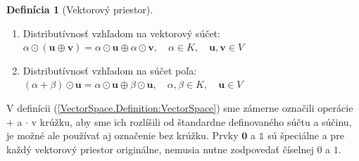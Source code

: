 \documentclass[a4paper, 10pt, ]{article}
\newcommand{\bm}[1]{\mathbf{#1}}
\theoremstyle{definition}
\newtheorem{definition}{Definícia}[section]
\begin{document}
\begin{definition}[Vektorový priestor]
\begin{enumerate}
        \item Distributívnosť vzhľadom na vektorový súčet: \\
        \tab\tab $\alpha \odot (\bm{u} \oplus \bm{v}) = \alpha \odot \bm{u} \oplus \alpha \odot \bm{v}, \quad \alpha \in K, \quad \bm{u}, \bm{v} \in V$
        
        \item Distributívnosť vzhľadom na súčet poľa: \\
        \tab\tab $(\alpha + \beta) \odot \bm{u} = \alpha \odot \bm{u} \oplus \beta \odot \bm{u}, \quad \alpha, \beta \in K, \quad \bm{u} \in V$
    \end{enumerate}
\end{definition}

V definícii (\ref{VectorSpace.Definition:VectorSpace}) sme zámerne označili operácie $+$ a $\cdot$ v krúžku, aby sme ich rozlíšili od štandardne definovaného súčtu a súčinu, je možné ale používať aj označenie bez krúžku. Prvky $\bm{0}$ a $\mathbb{1}$ sú špeciálne a pre každý vektorový priestor originálne, nemusia nutne zodpovedať číselnej $0$ a $1$.
\end{document}
